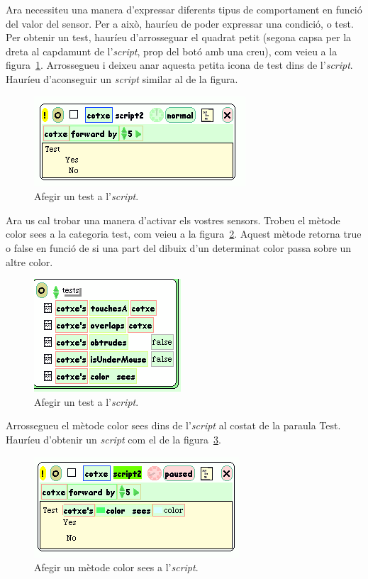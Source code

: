 Ara necessiteu una manera d'expressar diferents tipus de comportament en funció del valor del sensor. Per a això, hauríeu de poder expressar una condició, o test. Per obtenir un test, hauríeu d'arrosseguar el quadrat petit (segona capsa per la dreta al capdamunt de l'\emph{script}, prop del botó amb una creu), com veieu a la figura~\ref{fig2441}. Arrossegueu i deixeu anar aquesta petita icona de test dins de l'\emph{script}. Hauríeu d'aconseguir un \emph{script} similar al de la figura.
\begin{figure}[h!]
\begin{center}
\includegraphics[scale=0.6]{Imatges/figura24-41}
\end{center}
\caption{Afegir un test a l'\emph{script}.}
\label{fig2441}
\end{figure}

Ara us cal trobar una manera d'activar els vostres sensors. Trobeu el mètode \textsf{color sees} a la categoria \textsf{test}, com veieu a la figura~\ref{fig2442}. Aquest mètode retorna \textsf{true} o \textsf{false} en funció de si una part del dibuix d'un determinat color passa sobre un altre color.
\begin{figure}[h!]
\begin{center}
\includegraphics[scale=0.8]{Imatges/figura24-42}
\end{center}
\caption{Afegir un test a l'\emph{script}.}
\label{fig2442}
\end{figure}

Arrossegueu el mètode \textsf{color sees} dins de l'\emph{script} al costat de la paraula \textsf{Test}. Hauríeu d'obtenir un \emph{script} com el de la figura~\ref{fig2443}.
\begin{figure}[h!]
\begin{center}
\includegraphics[scale=0.6]{Imatges/figura24-43}
\end{center}
\caption{Afegir un mètode \textsf{\upshape color sees} a l'\emph{script}.}
\label{fig2443}
\end{figure}

